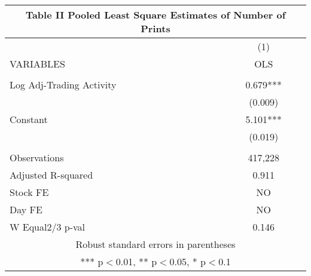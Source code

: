 \documentclass[]{article}
\begin{document}
\begin{tabular}{lc}
\multicolumn{2}{c}{Table II Pooled Least Square Estimates of Number of Prints} \\ \hline
 & (1) \\
VARIABLES & OLS \\ \hline
 &  \\
Log Adj-Trading Activity & 0.679*** \\
 & (0.009) \\
Constant & 5.101*** \\
 & (0.019) \\
 &  \\
Observations & 417,228 \\
Adjusted R-squared & 0.911 \\
Stock FE & NO \\
Day FE & NO \\
 W Equal2/3 p-val & 0.146 \\ \hline
\multicolumn{2}{c}{ Robust standard errors in parentheses} \\
\multicolumn{2}{c}{ *** p$<$0.01, ** p$<$0.05, * p$<$0.1} \\
\end{tabular}
\end{document}
